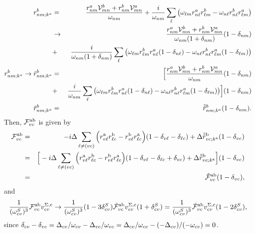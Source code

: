 \documentclass[floatfix,prb,aps,superscriptaddress,11pt]{revtex4}
\begin{document}
\begin{eqnarray}\label{rgen}
r_{nm;k^{a}}^{b}&=&
\frac{r_{nm}^{a}{\cal V}_{mn}^{b}+r_{nm}^{b}{\cal V}_{mn}^{a}}{\omega
_{nm}}+\frac{i}{\omega_{nm}}\sum_{\ell }\big(\omega_{\ell m}r_{n\ell }^{a}r_{\ell
m}^{b}-\omega_{n\ell }r_{n\ell }^{b}r_{\ell m}^{a}\big)
\nonumber\\
&\to&
\frac{r_{nm}^{a}{\cal V}_{mn}^{b}+r_{nm}^{b}{\cal V}_{mn}^{a}}{\omega
_{nm}(1+\delta_{nm})}(1-\delta_{nm})
\nonumber\\
&+&\frac{i}{\omega_{nm}(1+\delta_{nm})}\sum_{\ell }
\big(
\omega_{\ell m}
r_{\ell m}^{b}
 r_{n\ell }^{a}(1-\delta_{n\ell})
-\omega_{n\ell }
r_{n\ell }^{b}r_{\ell m}^{a}(1-\delta_{\ell m})\big)
\nonumber\\
r_{nm;k^{a}}^{b}
\to
\tilde r_{nm;k^{a}}^{b}
&=&
\Big[\frac{r_{nm}^{a}{\cal V}_{mn}^{b}+r_{nm}^{b}{\cal V}_{mn}^{a}}{\omega
_{nm}}(1-\delta_{nm})
\nonumber\\
&+&\frac{i}{\omega_{nm}}\sum_{\ell }
\big(
\omega_{\ell m}
r_{\ell m}^{b}
 r_{n\ell }^{a}(1-\delta_{n\ell})
-\omega_{n\ell }
r_{n\ell }^{b}r_{\ell m}^{a}(1-\delta_{\ell m})\big)
\Big]
(1-\delta_{nm})
\nonumber\\
\tilde r_{nm;k^{a}}^{b}
&=&
\tilde{\tilde{r}}_{nm;k^{a}}^{b}
 (1-\delta_{nm})
.
\end{eqnarray}
Then,
${\cal F}^{\mathrm{a}\mathrm{b}}_{vc}$ is given by
\begin{eqnarray}  \label{calfnmab}
\mathcal{F}_{vc}^{\mathrm{a}\mathrm{b}}
&=&
-i\Delta\sum_{\ell\neq(vc)}\Big(r_{v\ell }^{\mathrm{a}}r_{\ell
c}^{\mathrm{b}}-r_{v\ell }^{\mathrm{b}}r_{\ell c}^{\mathrm{a}}\Big)
(1-\delta_{v\ell} -\delta_{\ell c})
+
\Delta \tilde{\tilde{r}}_{vc;k^{\mathrm{a}}}^{\mathrm{b}}
 (1-\delta_{vc})
\nonumber\\
&=&
\Big[
-i\Delta\sum_{\ell\neq(vc)}\Big(r_{v\ell }^{\mathrm{a}}r_{\ell
c}^{\mathrm{b}}-r_{v\ell }^{\mathrm{b}}r_{\ell c}^{\mathrm{a}}\Big)
(1-\delta_{v\ell} -\delta_{\ell c}+\delta_{vc})
+
\Delta \tilde{\tilde{r}}_{vc;k^{\mathrm{a}}}^{\mathrm{b}}
\Big] 
(1-\delta_{vc})
\nonumber\\
&=&
\tilde{\mathcal{F}}_{vc}^{\mathrm{a}\mathrm{b}} (1-\delta_{vc})
,
\end{eqnarray}
and
\begin{equation}\label{v11}
\frac{1}{(\omega^S_{cv})^3}
\mathcal{F}_{vc}^{\mathrm{a}\mathrm{b}}v_{cv}^{\Sigma,\mathrm{c}}
\to
\frac{1}{(\omega^S_{cv})^3}(1-3\delta^S_{cv})
\tilde{\mathcal{F}}_{vc}^{\mathrm{a}\mathrm{b}} v_{cv}^{\Sigma,\mathrm{c}} (1+\delta_{cv}^S)
=
\frac{1}{(\omega^S_{cv})^3}
\tilde{\mathcal{F}}_{vc}^{\mathrm{a}\mathrm{b}} v_{cv}^{\Sigma,\mathrm{c}} (1-2\delta_{cv}^S)
,
\end{equation}
since $\delta_{cv}-\delta_{vc}=\Delta_{cv}/\omega_{cv} -\Delta_{vc}/\omega_{vc}
=\Delta_{cv}/\omega_{cv} -(-\Delta_{cv})/(-\omega_{cv})= 0$.
\end{document}
